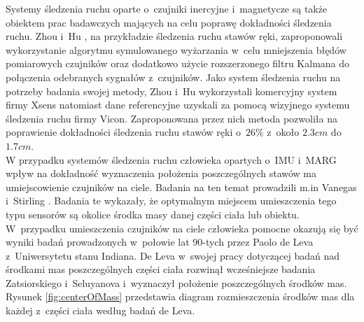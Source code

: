 Systemy śledzenia ruchu oparte o~czujniki inercyjne i~magnetycze są także obiektem prac badawczych mających na celu poprawę dokładności śledzenia ruchu. Zhou i~Hu \cite{Zhou2005,Zhou2006}, na przykładzie śledzenia ruchu stawów ręki, zaproponowali wykorzystanie algorytmu symulowanego wyżarzania w~celu mniejszenia błędów pomiarowych czujników oraz dodatkowo użycie rozszerzonego filtru Kalmana do połączenia odebranych sygnałów z~czujników. Jako system śledzenia ruchu na potrzeby badania swojej metody, Zhou i~Hu wykorzystali komercyjny system firmy Xsens natomiast dane referencyjne uzyskali za pomocą wizyjnego systemu śledzenia ruchu firmy Vicon. Zaproponowana przez nich metoda pozwoliła na poprawienie dokładności śledzenia ruchu stawów ręki o~$26\%$ z~około $2.3 cm$ do $1.7 cm$.\\

W przypadku systemów śledzenia ruchu człowieka opartych o~IMU i~MARG wpływ na dokładność wyznaczenia położenia poszczególnych stawów ma umiejscowienie czujników na ciele. Badania na ten temat prowadzili m.in Vanegas i~Stirling \cite{Vanegas2015}. Badania te wykazały, że optymalnym miejscem umieszczenia tego typu sensorów są okolice środka masy danej części ciała lub obiektu. W~przypadku umieszczenia czujników na ciele człowieka pomocne okazują się być wyniki badań prowadzonych w~połowie lat 90-tych przez Paolo de Leva z~Uniwersytetu stanu Indiana. De Leva w~swojej pracy dotyczącej badań nad środkami mas poszczególnych części ciała\cite{DeLeva1996} rozwinął wcześniejsze badania Zatsiorskiego i~Seluyanova \cite{549} i~wyznaczył położenie poszczególnych środków mas. Rysunek \ref{fig:centerOfMass} przedstawia diagram rozmieszczenia środków mas dla każdej z~części ciała według badań de Leva.

